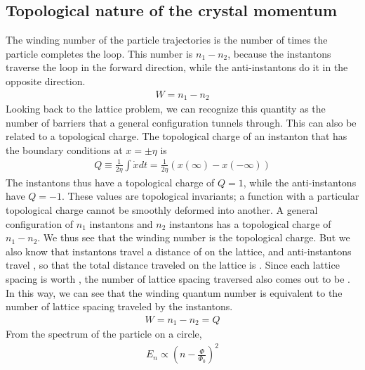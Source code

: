 \documentclass[12pt]{article}
\begin{document}
\subsection*{Topological nature of the crystal momentum}
The winding number of the particle trajectories is the number of times the particle completes the loop. This number is \(n_1 - n_2\), because the instantons traverse the loop in the forward direction, while the anti-instantons do it in the opposite direction.
\begin{equation}\begin{aligned}
	W = n_1 - n_2
\end{aligned}\end{equation}
Looking back to the lattice problem, we can recognize this quantity as the number of barriers that a general configuration tunnels through. This can also be related to a topological charge. The topological charge of an instanton that has the boundary conditions at \(x = \pm \eta\) is
\begin{equation}\begin{aligned}
	Q \equiv \frac{1}{2\eta}\int \dot x dt = \frac{1}{2\eta}\left(x(\infty) - x(-\infty)\right)
\end{aligned}\end{equation}
The instantons thus have a topological charge of \(Q = 1\), while the anti-instantons have \(Q = -1\). These values are topological invariants; a function with a particular topological charge cannot be smoothly deformed into another. A general configuration of \(n_1\) instantons and \(n_2\) instantons has a topological charge of \(n_1 - n_2\). We thus see that the winding number is the topological charge.
But we also know that  instantons travel a distance of  on the lattice, and  anti-instantons travel , so that the total distance traveled on the lattice is . Since each lattice spacing is worth \il{2\pi}, the number of lattice spacing traversed also comes out to be . In this way, we can see that the winding quantum number is equivalent to the number of lattice spacing traveled by the instantons.
\begin{equation}\begin{aligned}
	W = n_1 - n_2 = Q
\end{aligned}\end{equation}
From the spectrum of the particle on a circle,
\begin{equation}\begin{aligned}
	E_n \propto (n - \frac{\Phi}{\Phi_0})^2
\end{aligned}\end{equation}
\end{document}
